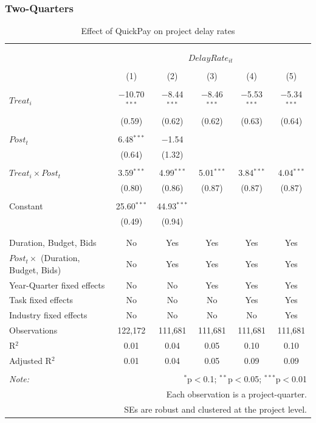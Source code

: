\documentclass[
]{article}
\begin{document}
\hypertarget{two-quarters-1}{%
\subsubsection{Two-Quarters}\label{two-quarters-1}}

\begin{table}[H] \centering 
  \caption{Effect of QuickPay on project delay rates} 
  \label{} 
\small 
\begin{tabular}{@{\extracolsep{-2pt}}lccccc} 
\\[-1.8ex]\hline 
\hline \\[-1.8ex] 
\\[-1.8ex] & \multicolumn{5}{c}{$DelayRate_{it}$} \\ 
\\[-1.8ex] & (1) & (2) & (3) & (4) & (5)\\ 
\hline \\[-1.8ex] 
 $Treat_i$ & $-$10.70$^{***}$ & $-$8.44$^{***}$ & $-$8.46$^{***}$ & $-$5.53$^{***}$ & $-$5.34$^{***}$ \\ 
  & (0.59) & (0.62) & (0.62) & (0.63) & (0.64) \\ 
  & & & & & \\ 
 $Post_t$ & 6.48$^{***}$ & $-$1.54 &  &  &  \\ 
  & (0.64) & (1.32) &  &  &  \\ 
  & & & & & \\ 
 $Treat_i \times Post_t$ & 3.59$^{***}$ & 4.99$^{***}$ & 5.01$^{***}$ & 3.84$^{***}$ & 4.04$^{***}$ \\ 
  & (0.80) & (0.86) & (0.87) & (0.87) & (0.87) \\ 
  & & & & & \\ 
 Constant & 25.60$^{***}$ & 44.93$^{***}$ &  &  &  \\ 
  & (0.49) & (0.94) &  &  &  \\ 
  & & & & & \\ 
\hline \\[-1.8ex] 
Duration, Budget, Bids & No & Yes & Yes & Yes & Yes \\ 
$Post_t \times$  (Duration, Budget, Bids) & No & Yes & Yes & Yes & Yes \\ 
Year-Quarter fixed effects & No & No & Yes & Yes & Yes \\ 
Task fixed effects & No & No & No & Yes & Yes \\ 
Industry fixed effects & No & No & No & No & Yes \\ 
Observations & 122,172 & 111,681 & 111,681 & 111,681 & 111,681 \\ 
R$^{2}$ & 0.01 & 0.04 & 0.05 & 0.10 & 0.10 \\ 
Adjusted R$^{2}$ & 0.01 & 0.04 & 0.05 & 0.09 & 0.09 \\ 
\hline 
\hline \\[-1.8ex] 
\textit{Note:}  & \multicolumn{5}{r}{$^{*}$p$<$0.1; $^{**}$p$<$0.05; $^{***}$p$<$0.01} \\ 
 & \multicolumn{5}{r}{Each observation is a project-quarter.} \\ 
 & \multicolumn{5}{r}{SEs are robust and clustered at the project level.} \\ 
\end{tabular} 
\end{table}
\end{document}
